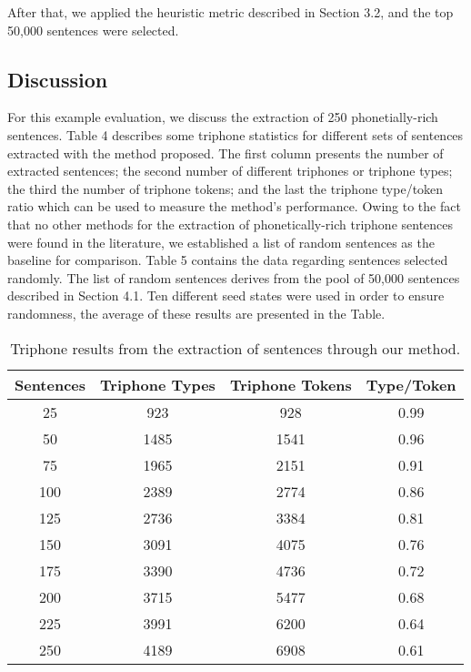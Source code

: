 After that, we applied the heuristic metric described in Section 3.2, and the top 50,000 sentences were selected.

\clearpage
\subsection{Discussion}

For this example evaluation, we discuss the extraction of 250 phonetially-rich sentences. Table 4 describes some triphone statistics for different sets of sentences extracted with the method proposed. The first column presents the number of extracted sentences; the second number of different triphones or triphone types; the third the number of triphone tokens; and the last the triphone type/token ratio which can be used to measure the method's performance. 
Owing to the fact that no other methods for the extraction of phonetically-rich triphone sentences were found in the literature,
we established a list of random sentences as the baseline for comparison. Table 5 contains the data regarding sentences selected randomly. The list of random sentences derives from the pool of 
50,000 sentences described in Section 4.1. Ten different seed states were used in order to ensure
randomness, the average of these results are presented in the Table. 

\begin{table}[H]
\begin{center}
\begin{tabular}{|c|c|c|c|}
\hline
Sentences & Triphone Types & Triphone Tokens & Type/Token \\ \hline
25 & 923 & 928 & 0.99 \\
50 & 1485 & 1541 & 0.96 \\
75 & 1965 & 2151 & 0.91 \\
100 & 2389 & 2774 & 0.86 \\
125 & 2736 & 3384 & 0.81 \\
150 & 3091 & 4075 & 0.76 \\
175 & 3390 & 4736 & 0.72 \\
200 & 3715 & 5477 & 0.68 \\
225 & 3991 & 6200 & 0.64 \\
250 & 4189 & 6908 & 0.61 \\ \hline
\end{tabular}
\end{center}
\caption{\label{results-tri-extracted} Triphone results from the extraction of sentences through our method.}
\end{table}

